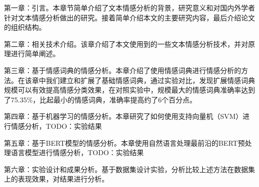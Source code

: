第一章：引言。本章节简单介绍了文本情感分析的背景，研究意义和对国内外学者针对文本情感分析做出的研究。接着简单介绍本文的主要研究内容，最后介绍论文的组织结构。

第二章：相关技术介绍。该章介绍了本文使用到的一些文本情感分析技术，并对原理进行简单阐述。

第三章：基于情感词典的情感分析。本章介绍了使用情感词典进行情感分析的方法。在该章中我们建立和扩展了基础情感词典，通过实验对比，发现扩展情感词典规模可以有效提高情感分类效果，在对照实验中，规模最大的情感词典准确率达到了75.35\%，比起最小的情感词典，准确率提高约了6个百分点。

第四章：基于机器学习的情感分析。本章研究了如何使用支持向量机（SVM）进行情感分析，TODO：实验结果

第五章：基于BERT模型的情感分析。本章使用自然语言处理最前沿的BERT预处理语言模型进行情感分析，TODO：实验结果

第六章：实验设计和成果分析。基于数据集设计实验，分析比较上述方法在数据集上的表现效果，对结果进行分析。
